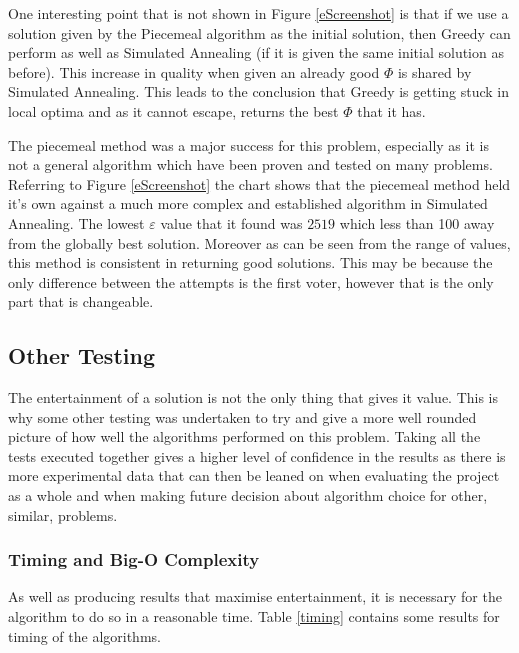 \documentclass[12pt]{report}
\begin{document}
One interesting point that is not shown in Figure \ref{eScreenshot} is that if we use a solution given by the Piecemeal algorithm as the initial solution, then Greedy can perform as well as Simulated Annealing (if it is given the same initial solution as before). This increase in quality when given an already good $\Phi$ is shared by Simulated Annealing. This leads to the conclusion that Greedy is getting stuck in local optima and as it cannot escape, returns the best $\Phi$ that it has.

The piecemeal method was a major success for this problem, especially as it is not a general algorithm which have been proven and tested on many problems. Referring to Figure \ref{eScreenshot} the chart shows that the piecemeal method held it's own against a much more complex and established algorithm in Simulated Annealing. The lowest $\varepsilon$ value that it found was $2519$ which less than 100 away from the globally best solution. Moreover as can be seen from the range of values, this method is consistent in returning good solutions. This may be because the only difference between the attempts is the first voter, however that is the only part that is changeable.


\subsection{Other Testing}\label{OtherTesting}
The entertainment of a solution is not the only thing that gives it value. This is why some other testing was undertaken to try and give a more well rounded picture of how well the algorithms performed on this problem. Taking all the tests executed together gives a higher level of confidence in the results as there is more experimental data that can then be leaned on when evaluating the project as a whole and when making future decision about algorithm choice for other, similar, problems.

\subsubsection{Timing and Big-O Complexity}
As well as producing results that maximise entertainment, it is necessary for the algorithm to do so in a reasonable time. Table \ref{timing} contains some results for timing of the algorithms.
\end{document}
